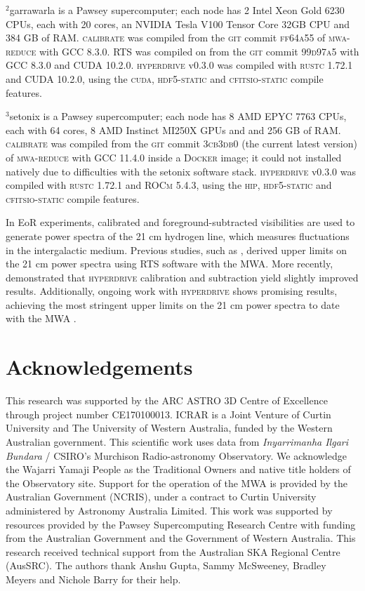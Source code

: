 \documentclass[summary]{ursi}
\newcommand{\hyperdrive}{\textsc{hyperdrive}}\newcommand{\mwalib}{\textsc{mwalib}}
\newcommand{\rts}{\textsc{RTS}}
\newcommand{\mwareduce}{\textsc{mwa-reduce}}
\newcommand{\calibrate}{\textsc{calibrate}}
\newcommand{\docker}{\textsc{Docker}}
\begin{document}
\begin{table*}[ht]
\begin{center}
  \flushleft $^2$garrawarla is a Pawsey supercomputer; each node
  has 2 Intel Xeon Gold 6230 CPUs, each with 20 cores, an NVIDIA Tesla V100
  Tensor Core 32GB CPU and 384 GB of RAM. \calibrate{} was compiled from
  the \textsc{git} commit \textsc{ff64a55} of \mwareduce{} with \textsc{GCC}
  8.3.0. \rts{} was compiled on from the \textsc{git} commit \textsc{99d97a5}
  with \textsc{GCC} 8.3.0 and \textsc{CUDA} 10.2.0. \hyperdrive{} v0.3.0
  was compiled with \textsc{rustc} 1.72.1 and \textsc{CUDA} 10.2.0, using
  the \textsc{cuda}, \textsc{hdf5-static} and \textsc{cfitsio-static} compile
  features.

  \flushleft $^3$setonix is a Pawsey supercomputer; each node
  has 8 AMD EPYC 7763 CPUs, each with 64 cores, 8 AMD Instinct MI250X GPUs
  and and 256 GB of RAM. \calibrate{} was compiled from the \textsc{git}
  commit \textsc{3cb3db0} (the current latest version) of \mwareduce{} with
  \textsc{GCC} 11.4.0 inside a \docker{} image; it could not installed natively
  due to difficulties with the setonix software stack. \hyperdrive{} v0.3.0
  was compiled with \textsc{rustc} 1.72.1 and \textsc{ROCm} 5.4.3, using
  the \textsc{hip}, \textsc{hdf5-static} and \textsc{cfitsio-static} compile
  features.
  \end{center}
\end{table*}

In EoR experiments, calibrated and foreground-subtracted visibilities are used to generate power spectra of the 21 cm hydrogen line, which measures fluctuations in the intergalactic medium. 
Previous studies, such as \cite{Trott2020}, derived upper limits on the 21 cm power spectra using \rts{} software with the MWA. 
More recently, \cite{nunhokee2024} demonstrated that \hyperdrive{} calibration and subtraction yield slightly improved results. Additionally, ongoing work with \hyperdrive{} shows promising results, achieving the most stringent upper limits on the 21 cm power spectra to date with the MWA \cite{nunhokee2025}.

\section{Acknowledgements}
This research was supported by the ARC ASTRO 3D Centre of Excellence through project number CE170100013. ICRAR is a Joint Venture of Curtin University and The University of Western Australia, funded by the Western Australian government. This scientific work uses data from \textit{Inyarrimanha Ilgari Bundara} / CSIRO's Murchison Radio-astronomy Observatory. We acknowledge the Wajarri Yamaji People as the Traditional Owners and native title holders of the Observatory site. Support for the operation of the MWA is provided by the Australian Government (NCRIS), under a contract to Curtin University administered by Astronomy Australia Limited. This work was supported by resources provided by the Pawsey Supercomputing Research Centre with funding from the Australian Government and the Government of Western Australia. This research received technical support from the Australian SKA Regional Centre (AusSRC). The authors thank Anshu Gupta, Sammy McSweeney, Bradley Meyers and Nichole Barry for their help.



\end{document}
